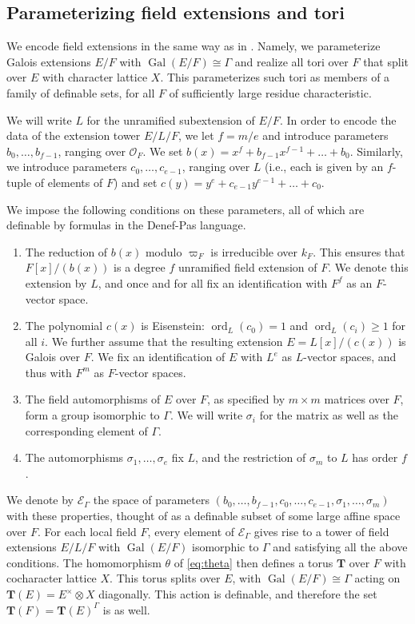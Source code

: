 \documentclass{amsart}
\newcommand{\ri}{\mathcal{O}}
\newcommand{\gal}{\operatorname{Gal}}
\newcommand{\bT}{\mathbf {T}}
\newcommand\cE{{\mathcal E}}
\DeclareMathOperator{\Gal}{Gal}
\DeclareMathOperator{\ord}{ord}
\theoremstyle{plain}
\theoremstyle{definition}
\begin{document}
\subsection{Parameterizing field extensions and tori}\label{sub:def_tori}
 
We encode field extensions in the same way as in \cite{CGH-2}.
Namely, we parameterize Galois extensions $E/F$ with $\Gal(E/F) \cong \Gamma$
and realize all tori over $F$ that split over $E$ with character lattice $X$.
This parameterizes such tori as members of a family of definable sets,
for all $F$ of sufficiently large residue characteristic. 

We will write $L$ for the unramified subextension of $E/F$.  In order to encode the data of the extension tower $E/L/F$, we let $f=m/e$ and introduce parameters $b_0,\dots, b_{f-1}$, ranging over $\ri_F$.
We set $b(x)=x^f+b_{f-1}x^{f-1}+ \dots + b_0$. 
Similarly, we introduce parameters $c_0, \dots, c_{e-1}$, ranging over $L$
(i.e., each is given by an $f$-tuple of elements of $F$) and set $c(y) = y^e + c_{e-1}y^{e-1} + \dots + c_0$.

We impose the following conditions on these parameters, all of which are definable by formulas in the Denef-Pas language. 
\begin{enumerate}
\item The reduction of $b(x)$ modulo $\varpi_F$ is irreducible over $k_F$. 
This ensures that $F[x]/(b(x))$ is a degree $f$ unramified field extension of $F$. 
We denote this extension by $L$, and once and for all fix an identification with $F^f$ as 
an $F$-vector space. 
\item The polynomial $c(x)$ is Eisenstein: $\ord_L(c_0) = 1$ and $\ord_L(c_i) \ge 1$ for all $i$.
We further assume that the resulting extension $E = L[x]/(c(x))$ is Galois over $F$.
We fix an identification of $E$ with $L^e$ as $L$-vector spaces, and thus with $F^m$ as $F$-vector spaces. 
\item The field automorphisms of $E$ over $F$, as specified by $m \times m$ matrices over $F$, form a group isomorphic to $\Gamma$.
We will write $\sigma_i$ for the matrix as well as the corresponding element of $\Gamma$.
\item The automorphisms $\sigma_1, \dots, \sigma_e$ fix $L$, and the restriction of $\sigma_m$ to $L$ has order $f$.
\end{enumerate}
We denote by $\cE_\Gamma$ the space of parameters $(b_0, \dots, b_{f-1}, c_0, \dots, c_{e-1}, \sigma_1, \dots, \sigma_m)$ with these properties,
thought of as a definable subset of some large affine space over $F$.
For each local field $F$, every element of $\cE_\Gamma$ gives rise to a tower of field extensions $E/L/F$
with $\gal(E/F)$ isomorphic to $\Gamma$ and satisfying all the above conditions.
The homomorphism $\theta$ of \eqref{eq:theta} then defines a torus $\bT$ over $F$ with cocharacter lattice $X$.
This torus splits over $E$, with $\gal(E/F) \cong \Gamma$ acting on $\bT(E) = E^\times \otimes X$ diagonally.
This action is definable, and therefore the set $\bT(F) = \bT(E)^\Gamma$ is as well.
\end{document}
